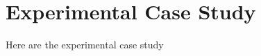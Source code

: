 \chapter{Experimental Case Study} 
\label{chapter:related_work}

Here are the experimental case study